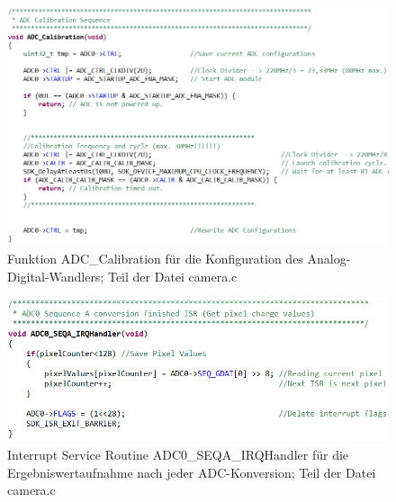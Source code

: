 \begin{figure}[H] %
\includegraphics[width=.95\textwidth]{sec7/images/code/ADCCalibration} 
\centering
\captionsetup{width=.95\textwidth}
\caption[Funktion \glqq{}ADC\_Calibration\grqq{} aus der Datei \glqq{}camera.c\grqq{}]{Funktion \glqq{}ADC\_Calibration\grqq{} für die Konfiguration des Analog-Digital-Wandlers; Teil der Datei \glqq{}camera.c\grqq{}}\centering
\label{fig:ADCCalibration}
\end{figure}


\begin{figure}[H] %
\includegraphics[width=.95\textwidth]{sec7/images/code/ADC0SEQAIRQHandler} 
\centering
\captionsetup{width=.95\textwidth}
\caption[Interrupt Service Routine \glqq{}ADC0\_SEQA\_IRQHandler\grqq{} aus der Datei \glqq{}camera.c\grqq{}]{Interrupt Service Routine \glqq{}ADC0\_SEQA\_IRQHandler\grqq{} für die Ergebniswertaufnahme nach jeder ADC-Konversion; Teil der Datei \glqq{}camera.c\grqq{}}\centering
\label{fig:ADC0SEQAIRGHandler}
\end{figure}

